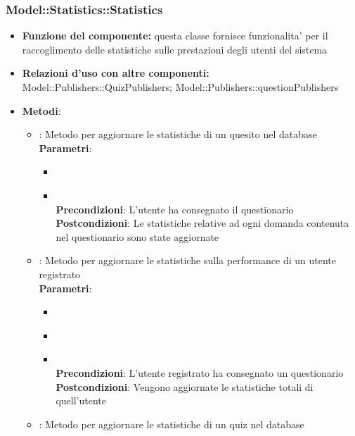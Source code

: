 \subsubsection{Model::Statistics::Statistics}
\begin{itemize}
\item\textbf{Funzione del componente:} questa classe fornisce funzionalita' per il raccoglimento delle statistiche sulle prestazioni degli utenti del sistema
\item\textbf{Relazioni d'uso con altre componenti:} Model::Publishers::QuizPublishers; Model::Publishers::questionPublishers\\
\item\textbf{Metodi}:
\begin{itemize}
	\item{} : Metodo per aggiornare le statistiche di un quesito nel database\\
	\textbf{Parametri}:
	\begin{itemize}
		\item{}\\
		\item{}\\
		\textbf{Precondizioni}: L'utente ha consegnato il questionario\\
		\textbf{Postcondizioni}: Le statistiche relative ad ogni domanda contenuta nel questionario sono state aggiornate\\
	\end{itemize}
	\item{} : Metodo per aggiornare le statistiche sulla performance di un utente registrato\\
	\textbf{Parametri}:
	\begin{itemize}
		\item{}\\
		\item{}\\
		\item{}\\
		\textbf{Precondizioni}: L'utente registrato ha consegnato un questionario\\
		\textbf{Postcondizioni}: Vengono aggiornate le statistiche totali di quell'utente\\
	\end{itemize}
	\item{} : Metodo per aggiornare le statistiche di un quiz nel database\\

\end{itemize}
\end{itemize}

